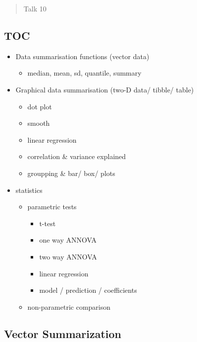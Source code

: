 \documentclass[
]{article}
\begin{document}
\begin{quote}
Talk 10
\end{quote}

\hypertarget{toc-2}{%
\subsection{TOC}\label{toc-2}}

\begin{itemize}
\item
  Data summarisation functions (vector data)

  \begin{itemize}
  \item
    median, mean, sd, quantile, summary
  \end{itemize}
\item
  Graphical data summarisation (two-D data/ tibble/ table)

  \begin{itemize}
  \item
    dot plot
  \item
    smooth
  \item
    linear regression
  \item
    correlation \& variance explained
  \item
    groupping \& bar/ box/ plots
  \end{itemize}
\item
  statistics

  \begin{itemize}
  \item
    parametric tests

    \begin{itemize}
    \item
      t-test
    \item
      one way ANNOVA
    \item
      two way ANNOVA
    \item
      linear regression
    \item
      model / prediction / coefficients
    \end{itemize}
  \item
    non-parametric comparison
  \end{itemize}
\end{itemize}

\hypertarget{vector-summarization}{%
\subsection{Vector Summarization}\label{vector-summarization}}
\end{document}
